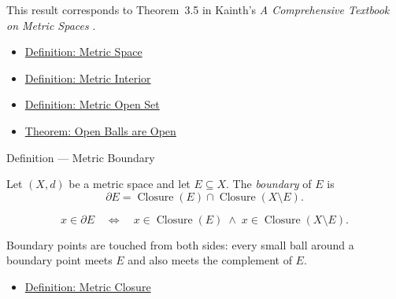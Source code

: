 \begin{remark*}
This result corresponds to Theorem~3.5 in Kainth's
\emph{A Comprehensive Textbook on Metric Spaces}
\cite{KainthComprehensiveMetricSpaces2023}.
\end{remark*}

\begin{dependencies}
\begin{itemize}
  \item \hyperref[def:metric-space]{Definition: Metric Space}
  \item \hyperref[def:metric-interior]{Definition: Metric Interior}
  \item \hyperref[def:metric-open-set]{Definition: Metric Open Set}
  \item \hyperref[thm:metric-open-balls-are-open]{Theorem: Open Balls are Open}
\end{itemize}
\end{dependencies}

\begin{definitionbox}{Definition --- Metric Boundary}
\begin{definition}\label{def:metric-boundary}
Let \((X,d)\) be a metric space and let \(E\subseteq X\).  The
\emph{boundary} of \(E\) is
\[
  \partial E
  =
  \operatorname{Closure}(E)\cap \operatorname{Closure}(X\setminus E).
\]
\end{definition}
\end{definitionbox}

\begin{remark*}
\[
x\in\partial E
\quad\Longleftrightarrow\quad
x\in\operatorname{Closure}(E)
\;\land\;
x\in\operatorname{Closure}(X\setminus E).
\]
\end{remark*}

\begin{remark*}[Interpretation]
Boundary points are touched from both sides: every small ball around a
boundary point meets \(E\) and also meets the complement of \(E\).
\end{remark*}

\begin{dependencies}
\begin{itemize}
  \item \hyperref[def:metric-closure]{Definition: Metric Closure}
\end{itemize}
\end{dependencies}
